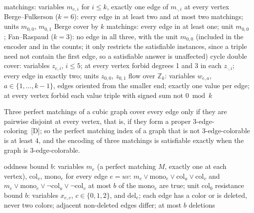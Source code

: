 \documentclass[11pt]{article}
\theoremstyle{definition}
\theoremstyle{remark}
\newcommand{\dd}{\textup{[D]}}
\begin{document}
\begin{algorithm}[htbp]
\caption{Perfect matching covers, cycle double covers and flows (EXP-002, EXP-003, EXP-008)}\label{alg:covers}
\begin{algorithmic}[1]
\State matchings: variables $m_{e,i}$ for $i \le k$, exactly one edge of $m_{\cdot,i}$ at every vertex
\State Berge--Fulkerson ($k=6$): every edge in at least two and at most two matchings; units $m_{0,0}$, $m_{0,1}$
\State Berge cover by $k$ matchings: every edge in at least one; unit $m_{0,0}$; Fan--Raspaud ($k=3$): no edge in all three, with the unit $m_{0,0}$ (included in the encoder and in the counts; it only restricts the satisfiable instances, since a triple need not contain the first edge, so a satisfiable answer is unaffected)
\State cycle double cover: variables $z_{e,i}$, $i \le 5$; at every vertex forbid degrees 1 and 3 in each $z_{\cdot,i}$; every edge in exactly two; units $z_{0,0}$, $z_{0,1}$
\State flow over $\mathbb Z_k$: variables $w_{e,a}$, $a \in \{1,\dots,k-1\}$, edges oriented from the smaller end; exactly one value per edge; at every vertex forbid each value triple with signed sum not $0 \bmod k$
\end{algorithmic}
\end{algorithm}

Three perfect matchings of a cubic graph cover every edge only if they are pairwise disjoint at every
vertex, that is, if they form a proper 3-edge-coloring~\dd{}; so the perfect matching index of a
graph that is not 3-edge-colorable is at least 4, and the encoding of three matchings is satisfiable
exactly when the graph is 3-edge-colorable.

\begin{algorithm}[htbp]
\caption{Oddness and resistance (EXP-003, EXP-008)}\label{alg:oddres}
\begin{algorithmic}[1]
\State oddness bound $b$: variables $m_e$ (a perfect matching $M$, exactly one at each vertex), $\mathrm{col}_v$, $\mathrm{mono}_e$
\State for every edge $e=uv$: $m_e \lor \mathrm{mono}_e \lor \mathrm{col}_u \lor \mathrm{col}_v$ and $m_e \lor \mathrm{mono}_e \lor \lnot\mathrm{col}_u \lor \lnot\mathrm{col}_v$
\State at most $b$ of the $\mathrm{mono}_e$ are true; unit $\mathrm{col}_0$
\State resistance bound $b$: variables $x_{e,c}$, $c \in \{0,1,2\}$, and $\mathrm{del}_e$; each edge has a color or is deleted, never two colors; adjacent non-deleted edges differ; at most $b$ deletions
\end{algorithmic}
\end{algorithm}
\end{document}
